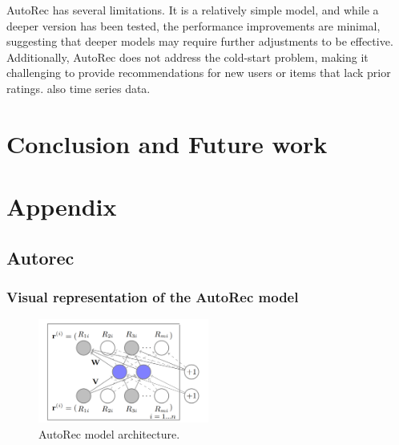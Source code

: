 \documentclass{ieeetj}
\begin{document}
AutoRec has several limitations. It is a relatively simple model, and while a deeper version has been tested, the performance improvements are minimal, suggesting that deeper models may require further adjustments to be effective. Additionally, AutoRec does not address the cold-start problem, making it challenging to provide recommendations for new users or items that lack prior ratings. also time series data.

\section{Conclusion and Future work}
\vfill\pagebreak





\appendix
\section{Appendix}
\subsection{Autorec}
\subsubsection{Visual representation of the AutoRec model}
\begin{figure}[h]
\centering
\includegraphics[width=0.5\textwidth]{figures/autorec.png}
\caption{AutoRec model architecture.}
\label{fig:autorec}
\end{figure}
\end{document}
